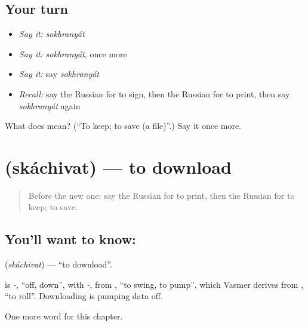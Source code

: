 \subsection*{Your turn}
\begin{itemize}
\raggedright
  \item \emph{Say it:} \emph{sokhranyát}
  \item \emph{Say it:} \emph{sokhranyát}, once more
  \item \emph{Say it:} say \emph{sokhranyát}
  \item \emph{Recall:} say the Russian for to sign, then the Russian for to print, then say \emph{sokhranyát} again
\end{itemize}

\begin{tcolorbox}[breakable,colback=teal!4,colframe=teal!35!black,title={Before you move on}]
What does  mean? (\textquotedblleft{}To keep; to save (a file)\textquotedblright{}.) Say it once more.
\end{tcolorbox}
\section[\texorpdfstring{\ru{скачивать} (skáchivat)}{скачивать (skáchivat)}]{ (skáchivat) — to download}

\label{lesson:RU-C145-skachivat}



\begin{quote}
Before the new one: say the Russian for to print, then the Russian for to keep; to save.
\end{quote}

\subsection*{You'll want to know: }
\textbf{} (\emph{skáchivat}) — \textquotedblleft{}to download\textquotedblright{}.

\begin{cousinweb}
\textbf{} is \emph{-}, \textquotedblleft{}off, down\textquotedblright{}, with \emph{-}, from \emph{}, \textquotedblleft{}to swing, to pump\textquotedblright{}, which Vasmer derives from \emph{}, \textquotedblleft{}to roll\textquotedblright{}. Downloading is pumping data off.
\end{cousinweb}

\begin{grammarlens}[title={What you've built}]
One more word for this chapter.
\end{grammarlens}

